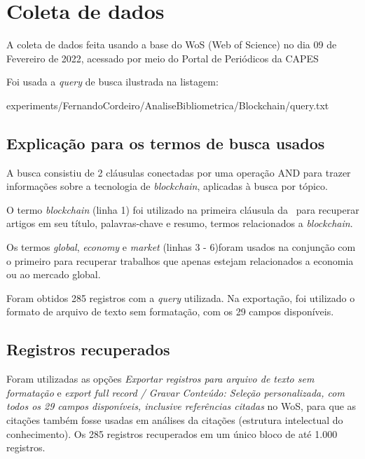 \section{Coleta de dados}

A coleta de dados feita usando a base do WoS (Web of Science) no dia 09 de Fevereiro de 2022, acessado por meio do Portal de Periódicos da CAPES

Foi usada a \textit{query} de busca ilustrada na listagem:


{experiments/FernandoCordeiro/AnaliseBibliometrica/Blockchain/query.txt}

\subsection{Explicação para os termos de busca usados\label{sec:FernandoCordeiro:query}}

A busca consistiu de 2 cláusulas conectadas por uma operação AND para trazer informações sobre a tecnologia de \textit{blockchain}, aplicadas à busca por tópico.

O termo \textit{blockchain} (linha 1) foi utilizado na primeira cláusula da \query\ para recuperar artigos em seu título, palavras-chave e resumo, termos relacionados a \textit{blockchain}. 

Os termos \textit{global}, \textit{economy} e \textit{market} (linhas 3 - 6)foram usados na conjunção com o primeiro para recuperar trabalhos que apenas estejam relacionados a economia ou ao mercado global.

Foram obtidos 285 registros com a \textit{query} utilizada. Na exportação, foi utilizado o formato de arquivo de texto sem formatação, com os 29 campos disponíveis.

\subsection{Registros recuperados}

Foram utilizadas as opções \textit{Exportar registros para arquivo de texto sem formatação} e \textit{export full record / Gravar Conteúdo: Seleção personalizada, com todos os 29 campos disponíveis, inclusive referências citadas} no WoS, para que as citações também fosse usadas em análises da citações (estrutura intelectual do conhecimento). 
Os 285 registros recuperados em um único bloco de até 1.000 registros.

